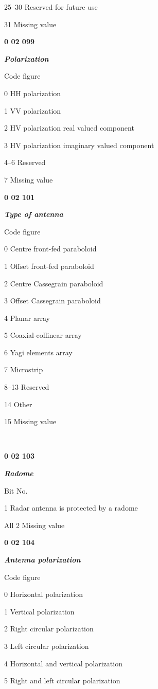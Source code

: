 25--30 Reserved for future use

31 Missing value

\textbf{0 02 099}

\emph{\textbf{Polarization}}

Code figure

0 HH polarization

1 VV polarization

2 HV polarization real valued component

3 HV polarization imaginary valued component

4--6 Reserved

7 Missing value

\textbf{0 02 101}

\emph{\textbf{Type of antenna}}

Code figure

0 Centre front-fed paraboloid

1 Offset front-fed paraboloid

2 Centre Cassegrain paraboloid

3 Offset Cassegrain paraboloid

4 Planar array

5 Coaxial-collinear array

6 Yagi elements array

7 Microstrip

8--13 Reserved

14 Other

15 Missing value

\textbf{\\
}

\textbf{0 02 103}

\emph{\textbf{Radome}}

Bit No.

1 Radar antenna is protected by a radome

All 2 Missing value

\textbf{0 02 104}

\emph{\textbf{Antenna polarization}}

Code figure

0 Horizontal polarization

1 Vertical polarization

2 Right circular polarization

3 Left circular polarization

4 Horizontal and vertical polarization

5 Right and left circular polarization


